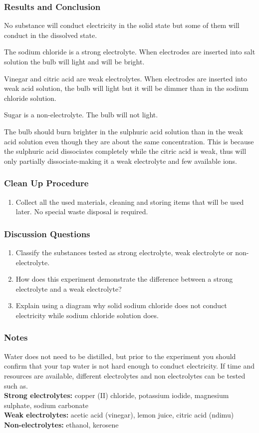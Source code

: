 \subsubsection*{Results and Conclusion}
No substance will conduct electricity in the solid state but some of them will conduct in the dissolved state.

The sodium chloride is a strong electrolyte. When electrodes are inserted into salt solution the bulb will light and will be bright.

Vinegar and citric acid are weak electrolytes. When electrodes are inserted into weak acid solution, the bulb will light but it will be dimmer than in the sodium chloride solution.

Sugar is a non-electrolyte. The bulb will not light.

The bulb should burn brighter in the sulphuric acid solution than in the weak acid solution even though they are about the same concentration. This is because the sulphuric acid dissociates completely while the citric acid is weak, thus will only partially dissociate-making it a weak electrolyte and few available ions.

\subsubsection*{Clean Up Procedure}
\begin{enumerate}
\item{Collect all the used materials, cleaning and storing items that will be used later. No special waste disposal is required.}
\end{enumerate}

\subsubsection*{Discussion Questions}
\begin{enumerate}
\item{Classify the substances tested as strong electrolyte, weak electrolyte or non-electrolyte.}
\item{How does this experiment demonstrate the difference between a strong electrolyte and a weak electrolyte?}
\item{Explain using a diagram why solid sodium chloride does not conduct electricity while sodium chloride solution does.}
\end{enumerate}

\subsubsection*{Notes}
Water does not need to be distilled, but prior to the experiment you should confirm that your tap water is not hard enough to conduct electricity.
If time and resources are available, different electrolytes and non electrolytes can be tested such as.\\
\textbf{Strong electrolytes:} copper (II) chloride, potassium iodide, magnesium sulphate, sodium carbonate\\
\textbf{Weak electrolytes:} acetic acid (vinegar), lemon juice, citric acid (ndimu)\\
\textbf{Non-electrolytes:} ethanol, kerosene

